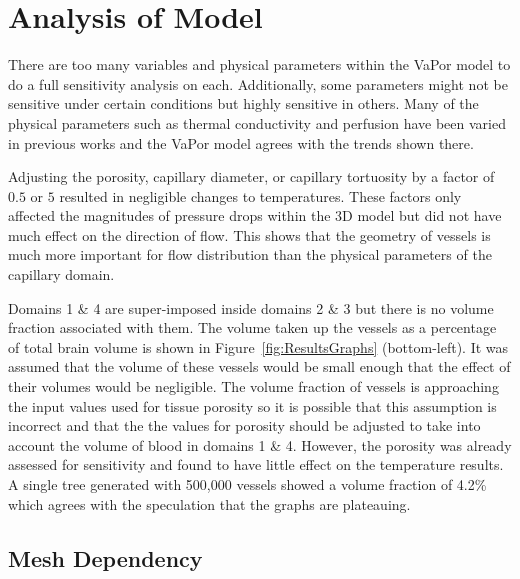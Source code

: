 \documentclass[11pt,english,a4paper,twoside,openright]{report}
\begin{document}
{{{{{{{{\section[Analysis of Model]{{\Large A}nalysis of {\Large M}odel} 

There are too many variables and physical parameters within the VaPor model to do a full sensitivity analysis on each. Additionally, some parameters might not be sensitive under certain conditions but highly sensitive in others. Many of the physical parameters such as thermal conductivity and perfusion have been varied in previous works \cite{xuan1997bioheat}\cite{zhu2001theoretical}\cite{van2000numerical} and the VaPor model agrees with the trends shown there.

Adjusting the porosity, capillary diameter, or capillary tortuosity by a factor of $0.5$ or $5$ resulted in negligible changes to temperatures. These factors only affected the magnitudes of pressure drops within the 3D model but did not have much effect on the direction of flow. This shows that the geometry of vessels is much more important for flow distribution than the physical parameters of the capillary domain.

Domains 1 \& 4 are super-imposed inside domains 2 \& 3 but there is no volume fraction associated with them. The volume taken up the vessels as a percentage of total brain volume is shown in Figure~\ref{fig:ResultsGraphs} (bottom-left). It was assumed that the volume of these vessels would be small enough that the effect of their volumes would be negligible. The volume fraction of vessels is approaching the input values used for tissue porosity so it is possible that this assumption is incorrect and that the the values for porosity should be adjusted to take into account the volume of blood in domains 1 \& 4. However, the porosity was already assessed for sensitivity and found to have little effect on the temperature results. A single tree generated with 500,000 vessels showed a volume fraction of 4.2\% which agrees with the speculation that the graphs are plateauing.

\subsection{Mesh Dependency} 

}}}}}}}}
\end{document}
